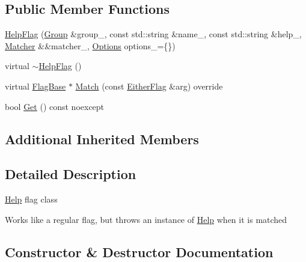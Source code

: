 \subsection*{Public Member Functions}
\begin{DoxyCompactItemize}
\item 
\hyperlink{classargs_1_1_help_flag_a6ee9c6725d5ce9d57090e2aab59cb050}{Help\+Flag} (\hyperlink{classargs_1_1_group}{Group} \&group\+\_\+, const std\+::string \&name\+\_\+, const std\+::string \&help\+\_\+, \hyperlink{classargs_1_1_matcher}{Matcher} \&\&matcher\+\_\+, \hyperlink{namespaceargs_aa530c0f95194aa275f49a5f299ac9e77}{Options} options\+\_\+=\{\})
\item 
virtual \hyperlink{classargs_1_1_help_flag_acd28f5106f158d7da9aace1ea55bea63}{$\sim$\+Help\+Flag} ()
\item 
virtual \hyperlink{classargs_1_1_flag_base}{Flag\+Base} $\ast$ \hyperlink{classargs_1_1_help_flag_a1a555992a7c8350aca0ac1f292d91605}{Match} (const \hyperlink{structargs_1_1_either_flag}{Either\+Flag} \&arg) override
\item 
bool \hyperlink{classargs_1_1_help_flag_a4a7d60a403961377da9cf9203f7b4203}{Get} () const noexcept
\end{DoxyCompactItemize}
\subsection*{Additional Inherited Members}


\subsection{Detailed Description}
\hyperlink{classargs_1_1_help}{Help} flag class

Works like a regular flag, but throws an instance of \hyperlink{classargs_1_1_help}{Help} when it is matched 

\subsection{Constructor \& Destructor Documentation}
\mbox{\label{classargs_1_1_help_flag_a6ee9c6725d5ce9d57090e2aab59cb050}} 
